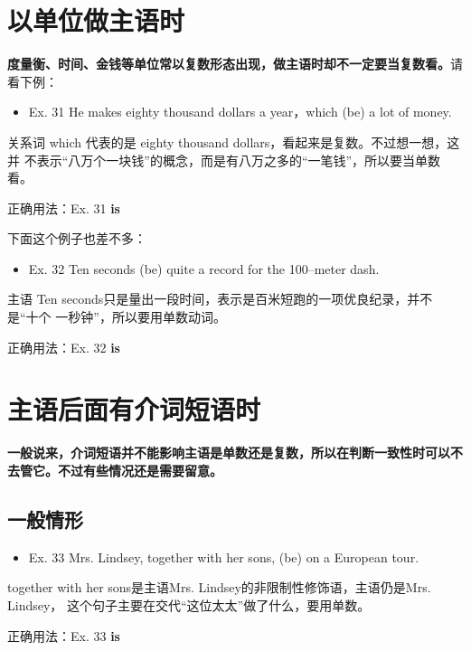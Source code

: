 \section{以单位做主语时}

\textbf{度量衡、时间、金钱等单位常以复数形态出现，做主语时却不一定要当复数看。}请看下例：
\begin{mybox}
\begin{itemize}
\item   Ex. 31 He makes eighty thousand dollars a year，which (be) a lot of
  money.
\end{itemize}

关系词 which 代表的是 eighty thousand dollars，看起来是复数。不过想一想，这并
不表示“八万个一块钱”的概念，而是有八万之多的“一笔钱”，所以要当单数看。

\tcblower

正确用法：Ex. 31 \textbf{is}
\end{mybox}

下面这个例子也差不多：
\begin{mybox}

\begin{itemize}
\item   Ex. 32 Ten seconds (be) quite a record for the 100--meter dash.
\end{itemize}

主语 Ten seconds只是量出一段时间，表示是百米短跑的一项优良纪录，并不是“十个
一秒钟”，所以要用单数动词。

\tcblower

正确用法：Ex. 32 \textbf{is}
\end{mybox}

\section{主语后面有介词短语时}

\textbf{一般说来，介词短语并不能影响主语是单数还是复数，所以在判断一致性时可以不
  去管它。不过有些情况还是需要留意。}

\subsection{一般情形}

\begin{mybox}
\begin{itemize}
\item  Ex. 33 Mrs. Lindsey, together with her sons, (be) on a European tour.
\end{itemize}

together with her sons是主语Mrs. Lindsey的非限制性修饰语，主语仍是Mrs. Lindsey，
这个句子主要在交代“这位太太”做了什么，要用单数。

\tcblower

正确用法：Ex. 33 \textbf{is}
\end{mybox}

